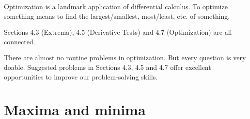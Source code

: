 \documentclass[../main.tex]{subfiles}
\begin{document}
 Optimization is a landmark application of differential calculus.  
To optimize something means to find the largest/smallest, most/least, etc. of something. 

Sections 4.3 (Extrema), 4.5 (Derivative Tests) and 4.7 (Optimization) are all connected.

\faExclamationTriangle{} There are almost no routine problems in optimization. But every question is very doable. Suggested problems in Sections 4.3, 4.5 and 4.7 offer excellent opportunities to improve our problem-solving skills.

\section{Maxima and minima}
\end{document}
